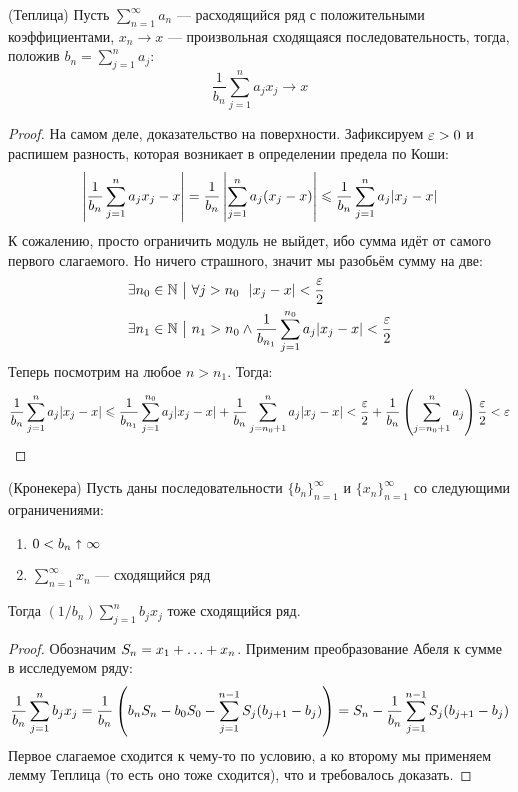 \begin{lemma} (Теплица)
	Пусть $\sum_{n = 1}^\infty a_n$ --- расходящийся ряд с положительными коэффициентами, $x_n \to x$ --- произвольная сходящаяся последовательность, тогда, положив $b_n = \sum_{j = 1}^n a_j$:
	\[
		\frac{1}{b_n} \sum_{j = 1}^n a_jx_j \to x
	\]
\end{lemma}

\begin{proof}
	На самом деле, доказательство на поверхности. Зафиксируем $\varepsilon > 0$ и распишем разность, которая возникает в определении предела по Коши:
	\[
		\left|\frac{1}{b_n} \sum_{j = 1}^n a_jx_j - x\right| = \frac{1}{b_n} \left|\sum_{j = 1}^n a_j(x_j - x)\right| \leqslant \frac{1}{b_n} \sum_{j = 1}^n a_j|x_j - x|
	\]
	К сожалению, просто ограничить модуль не выйдет, ибо сумма идёт от самого первого слагаемого. Но ничего страшного, значит мы разобьём сумму на две:
	\begin{align*}
		&{\exists n_0 \in \mathbb{N} \ \big|\  \forall j > n_0\ \ |x_j - x| < \frac{\varepsilon}{2}}
		\\
		&{\exists n_1 \in \mathbb{N} \ \big|\  n_1 > n_0 \wedge \frac{1}{b_{n_1}} \sum_{j = 1}^{n_0} a_j|x_j - x|} < \frac{\varepsilon}{2}
	\end{align*}
	Теперь посмотрим на любое $n > n_1$. Тогда:
	\[
		\frac{1}{b_n} \sum_{j = 1}^n a_j|x_j - x| \leqslant \frac{1}{b_{n_1}}\sum_{j = 1}^{n_0} a_j|x_j - x| + \frac{1}{b_n} \sum_{j = n_0 + 1}^n a_j|x_j - x| < \frac{\varepsilon}{2} + \frac{1}{b_n}\left(\sum_{j = n_0 + 1}^n a_j\right) \frac{\varepsilon}{2} < \varepsilon
	\]
\end{proof}

\begin{lemma} (Кронекера)
	Пусть даны последовательности $\{b_n\}_{n = 1}^\infty$ и $\{x_n\}_{n = 1}^\infty$ со следующими ограничениями:
	\begin{enumerate}
		\item $0 < b_n \shortuparrow \infty$
		
		\item $\sum_{n = 1}^\infty x_n$ --- сходящийся ряд
	\end{enumerate}
	Тогда $(1 / b_n)\sum_{j = 1}^n b_jx_j$ тоже сходящийся ряд.
\end{lemma}

\begin{proof}
	Обозначим $S_n = x_1 + \ldots + x_n$. Применим преобразование Абеля к сумме в исследуемом ряду:
	\[
		\frac{1}{b_n}\sum_{j = 1}^n b_jx_j = \frac{1}{b_n}\left(b_nS_n - b_0S_0 - \sum_{j = 1}^{n - 1} S_j(b_{j + 1} - b_j)\right) = S_n - \frac{1}{b_n}\sum_{j = 1}^{n - 1} S_j(b_{j + 1} - b_j)
	\]
	Первое слагаемое сходится к чему-то по условию, а ко второму мы применяем лемму Теплица (то есть оно тоже сходится), что и требовалось доказать.
\end{proof}

